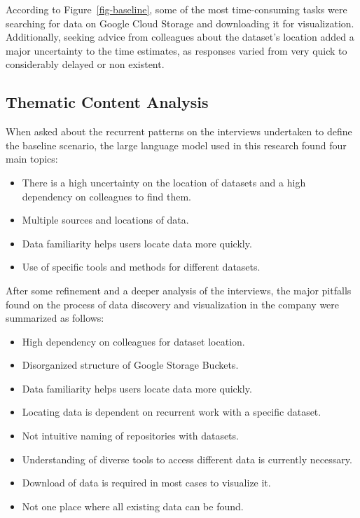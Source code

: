 \documentclass[
  oneside,
  open=any]{scrbook}
\providecommand{\tightlist}{%
  \setlength{\itemsep}{0pt}\setlength{\parskip}{0pt}}\usepackage{longtable,booktabs,array}
\begin{document}
According to Figure~\ref{fig-baseline}, some of the most time-consuming
tasks were searching for data on Google Cloud Storage and downloading it
for visualization. Additionally, seeking advice from colleagues about
the dataset's location added a major uncertainty to the time estimates,
as responses varied from very quick to considerably delayed or non
existent.

\subsection{Thematic Content Analysis}\label{thematic-content-analysis}

When asked about the recurrent patterns on the interviews undertaken to
define the baseline scenario, the large language model used in this
research found four main topics:

\begin{itemize}
\tightlist
\item
  There is a high uncertainty on the location of datasets and a high
  dependency on colleagues to find them.
\item
  Multiple sources and locations of data.
\item
  Data familiarity helps users locate data more quickly.
\item
  Use of specific tools and methods for different datasets.
\end{itemize}

After some refinement and a deeper analysis of the interviews, the major
pitfalls found on the process of data discovery and visualization in the
company were summarized as follows:

\begin{itemize}
\tightlist
\item
  High dependency on colleagues for dataset location.
\item
  Disorganized structure of Google Storage Buckets.
\item
  Data familiarity helps users locate data more quickly.
\item
  Locating data is dependent on recurrent work with a specific dataset.
\item
  Not intuitive naming of repositories with datasets.
\item
  Understanding of diverse tools to access different data is currently
  necessary.
\item
  Download of data is required in most cases to visualize it.
\item
  Not one place where all existing data can be found.
\end{itemize}
\end{document}
